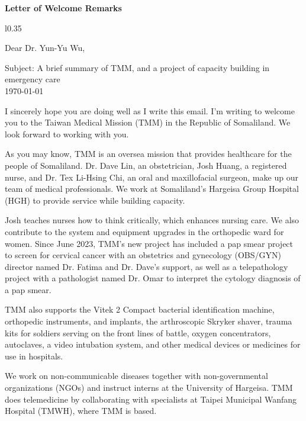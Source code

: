 \documentclass{letter}
\date{}
\begin{document}
\begin{letter}
{
\centering \Large \textbf{Letter of Welcome Remarks}
}

\hfill
\begin{wrapfigure}[1]{l}{0.35\linewidth}%
    \centering
    
\end{wrapfigure}

\opening{Dear Dr. Yun-Yu Wu,} %
\medskip 


Subject: A brief summary of TMM, and a project of capacity building in emergency care\\
 \today






I sincerely hope you are doing well as I write this email. I'm writing to welcome you to the Taiwan Medical Mission (TMM) in the Republic of Somaliland. 
We look forward to working with you.

As you may know, TMM is an oversea mission that provides healthcare for the people of Somaliland. Dr. Dave Lin, an obstetrician, Josh Huang, a registered nurse, and Dr. Tex Li-Hsing Chi, an oral and maxillofacial surgeon, make up our team of medical professionals. We work at Somaliland's Hargeisa Group Hospital (HGH) to provide service while building capacity.

Josh teaches nurses how to think critically, which enhances nursing care. We also contribute to the system and equipment upgrades in the orthopedic ward for women. 
Since June 2023, TMM's new project has included a pap smear project to screen for cervical cancer with an obstetrics and gynecology (OBS/GYN) director named Dr. Fatima and Dr. Dave's support, as well as a telepathology project with a pathologist named Dr. Omar to interpret the cytology diagnosis of a pap smear.

TMM also supports the Vitek 2 Compact bacterial identification machine, orthopedic instruments, and implants, the arthroscopic Skryker shaver, trauma kits for soldiers serving on the front lines of battle, oxygen concentrators, autoclaves, a video intubation system, and other medical devices or medicines for use in hospitals.

We work on non-communicable diseases together with non-governmental organizations (NGOs) and instruct interns at the University of Hargeisa. 
TMM does telemedicine by collaborating with specialists at Taipei Municipal Wanfang Hospital (TMWH), where TMM is based.



\end{letter}
\end{document}
